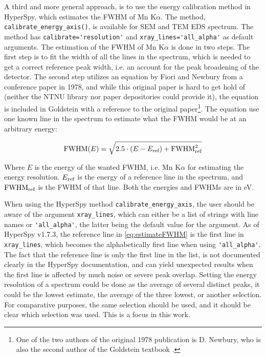 A third and more general approach, is to use the energy calibration method in HyperSpy, which estimates the FWHM of Mn K$\alpha$.
The method, \verb|calibrate_energy_axis()|, is available for  SEM and TEM EDS spectrum.
The method has \verb|calibrate='resolution'| and \verb|xray_lines='all_alpha'| as default arguments.
The estimation of the FWHM of Mn K$\alpha$ is done in two steps.
The first step is to fit the width of all the lines in the spectrum, which is needed to get a correct reference peak width, i.e. an account for the peak broadening of the detector.
The second step utilizes an equation by Fiori and Newbury from a conference paper in 1978, and while this original paper is hard to get hold of (neither the NTNU library nor paper depositories could provide it), the equation is included in Goldstein \cite[Ch. 16.1.1]{goldstein_scanning_2018} with a reference to the original paper\footnote{One of the two authors of the original 1978 publication is D. Newbury, who is also the second author of the Goldstein textbook \cite{goldstein_scanning_2018}.}.
The equation use one known line in the spectrum to estimate what the FWHM would be at an arbitrary energy:

\begin{equation}
    \label{eq:estimateFWHM}
    \textnormal{FWHM}(E) =  \sqrt{2.5 \cdot (E - E_\textnormal{ref}) + \textnormal{FWHM}^2_{\textnormal{ref}}}
\end{equation}

Where $E$ is the energy of the wanted FWHM, i.e. Mn K$\alpha$ for estimating the energy resolution.
$E_\textnormal{ref}$ is the energy of a reference line in the spectrum, and $\textnormal{FWHM}_{\textnormal{ref}}$ is the FWHM of that line.
Both the energies and FWHMs are in eV.

When using the HyperSpy method \verb|calibrate_energy_axis|, the user should be aware of the argument \verb|xray_lines|, which can either be a list of strings with line names or \verb|'all_alpha'|, the latter being the default value for the argument.
As of HyperSpy v1.7.3, the reference line in \cref{eq:estimateFWHM} is the first line in \verb|xray_lines|, which becomes the alphabetically first line when using \verb|'all_alpha'|.
The fact that the reference line is only the first line in the list, is not documented clearly in the HyperSpy documentation, and can yield unexpected results when the first line is affected by much noise or severe peak overlap.
Setting the energy resolution of a spectrum could be done as the average of several distinct peaks, it could be the lowest estimate, the average of the three lowest, or another selection.
For comparative purposes, the same selection should be used, and it should be clear which selection was used.
This is a focus in this work.



